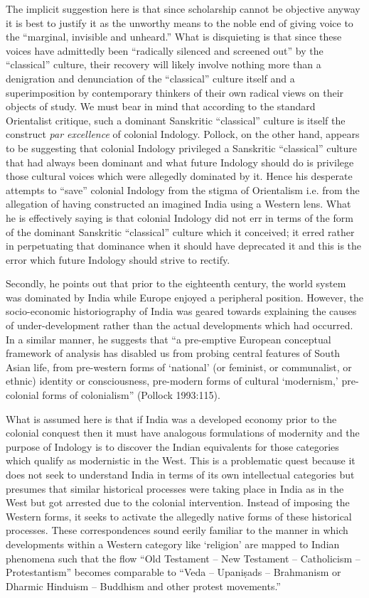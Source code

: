 The implicit suggestion here is that since scholarship cannot be objective anyway it is best to justify it as the unworthy means to the noble end of giving voice to the “marginal, invisible and unheard.” What is disquieting is that since these voices have admittedly been “radically silenced and screened out” by the “classical” culture, their recovery will likely involve nothing more than a denigration and denunciation of the “classical” culture itself and a superimposition by contemporary thinkers of their own radical views on their objects of study. We must bear in mind that according to the standard Orientalist critique, such a dominant Sanskritic “classical” culture is itself the construct {\sl par excellence} of colonial Indology. Pollock, on the other hand, appears to be suggesting that colonial Indology privileged a Sanskritic “classical” culture that had always been dominant and what future Indology should do is privilege those cultural voices which were allegedly dominated by it. Hence his desperate attempts to “save” colonial Indology from the stigma of Orientalism i.e. from the allegation of having constructed an imagined India using a Western lens. What he is effectively saying is that colonial Indology did not err in terms of the form of the dominant Sanskritic “classical” culture which it conceived; it erred rather in perpetuating that dominance when it should have deprecated it and this is the error which future Indology should strive to rectify.  


Secondly, he points out that prior to the eighteenth century, the world system was dominated by India while Europe enjoyed a peripheral position. However, the socio-economic historiography of India was geared towards explaining the causes of under-development rather than the actual developments which had occurred. In a similar manner, he suggests that “a pre-emptive European conceptual framework of analysis has disabled us from probing central features of South Asian life, from pre-western forms of ‘national’ (or feminist, or communalist, or ethnic) identity or consciousness, pre-modern forms of cultural ‘modernism,’ pre-colonial forms of colonialism” (Pollock 1993:115). 

What is assumed here is that if India was a developed economy prior to the colonial conquest then it must have analogous formulations of modernity and the purpose of Indology is to discover the Indian equivalents for those categories which qualify as modernistic in the West. This is a problematic quest because it does not seek to understand India in terms of its own intellectual categories but presumes that similar historical processes were taking place in India as in the West but got arrested due to the colonial intervention. Instead of imposing the Western forms, it seeks to activate the allegedly native forms of these historical processes. These correspondences sound eerily familiar to the manner in which developments within a Western category like ‘religion’ are mapped to Indian phenomena such that the flow “Old Testament – New Testament – Catholicism – Protestantism” becomes comparable to “Veda – Upaniṣads – Brahmanism or Dharmic Hinduism – Buddhism and other protest movements.”


